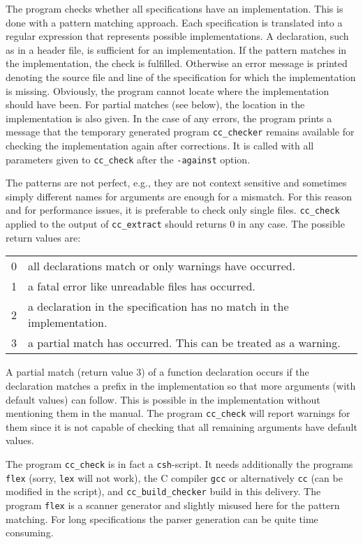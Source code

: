 \documentclass[12pt]{article}
\makeatletter
\newcommand{\TTindex}[1]{\index{#1@{\tt #1}}}
\makeatother
\begin{document}
The program checks whether all specifications have an implementation.
This is done with a pattern matching approach. Each specification is
translated into a regular expression that represents possible
implementations. A declaration, such as in a header file, is
sufficient for an implementation.  If the pattern matches in the
implementation, the check is fulfilled.  Otherwise an error message is
printed denoting the source file and line of the specification for
which the implementation is missing. Obviously, the program cannot
locate where the implementation should have been. For partial matches
(see below), the location in the implementation is also given. In the
case of any errors, the program prints a message that the temporary
generated program {\tt cc\_checker} remains available for checking the
implementation again after corrections. It is called with all
parameters given to {\tt cc\_check} after the {\tt -against} option.

The patterns are not perfect, e.g., they are not context sensitive and
sometimes simply different names for arguments are enough for a
mismatch. For this reason and for performance issues, it is preferable
to check only single files.  {\tt cc\_check} applied to the output of
{\tt cc\_extract} should returns 0 in any case. The possible return
values are:

\begin{tabular}{ll}
    0      & all declarations match or only warnings have occurred.\\
    1      & a fatal error like unreadable files has occurred.\\
    2      & a declaration in the specification has no match in the
             implementation.\\
    3      & a partial match has occurred. This can be treated as a warning.
\end{tabular}

A partial match (return value 3) of a function declaration occurs if
the declaration matches a prefix in the implementation so that more
arguments (with default values) can follow. This is possible in the
implementation without mentioning them in the manual. The program
{\tt cc\_check} will report warnings for them since it is not capable
of checking that all remaining arguments have default values.


The program {\tt cc\_check} is in fact a {\tt csh}-script. It needs
additionally the programs {\tt flex} (sorry, {\tt lex} will not work),
the C compiler {\tt gcc} or alternatively {\tt cc} (can be modified in
the script), and {\tt cc\_build\_checker} build in this delivery.
The program {\tt flex} is a scanner generator and slightly misused
here for the pattern matching. For long specifications the parser
generation can be quite time consuming.
\TTindex{cc\_build\_checker}
\TTindex{flex}\TTindex{gcc}
\end{document}
